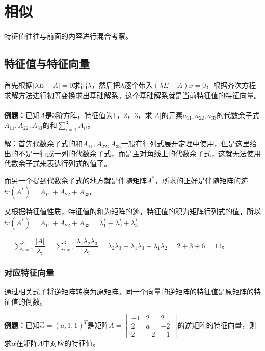 \newpage
\section{相似}

特征值往往与前面的内容进行混合考察。

\subsection{特征值与特征向量}

首先根据$\vert\lambda E-A\vert=0$求出$\lambda$，然后把$\lambda$逐个带入$(\lambda E-A)x=0$，根据齐次方程求解方法进行初等变换求出基础解系。这个基础解系就是当前特征值的特征向量。

\paragraph{}

\textbf{例题：}已知$A$是3阶方阵，特征值为1，2，3，求$\vert A\vert$的元素$a_{11},a_{22},a_{33}$的代数余子式$A_{11},A_{22},A_{33}$的和$\sum\limits_{i=1}^3A_{ii}$。

解：首先代数余子式的和$A_{11},A_{22},A_{33}$一般在行列式展开定理中使用，但是这里给出的不是一行或一列的代数余子式，而是主对角线上的代数余子式，这就无法使用代数余子式来表达行列式的值了。

而另一个提到代数余子式的地方就是伴随矩阵$A^*$，所求的正好是伴随矩阵的迹$tr(A^*)=A_{11}+A_{22}+A_{33}$。

又根据特征值性质，特征值的和为矩阵的迹，特征值的积为矩阵行列式的值，所以$tr(A^*)=A_{11}+A_{22}+A_{33}=\lambda_1^*+\lambda_2^*+\lambda_3^*$

$=\sum\limits_{i=1}^3\dfrac{\vert A\vert}{\lambda_i}=\sum\limits_{i=1}^3\dfrac{\lambda_1\lambda_2\lambda_3}{\lambda_i}=\lambda_2\lambda_3+\lambda_1\lambda_3+\lambda_1\lambda_2=2+3+6=11$。

\paragraph{}

\subsubsection{对应特征向量}

通过相关式子将逆矩阵转换为原矩阵。同一个向量的逆矩阵的特征值是原矩阵的特征值的倒数。

\textbf{例题：}已知$\overrightarrow{\alpha}=(a,1,1)^T$是矩阵$A=\left[\begin{array}{ccc}
    -1 & 2 & 2 \\
    2 & a & -2 \\
    2 & -2 & -1
\end{array}\right]$的逆矩阵的特征向量，则求$\overrightarrow{\alpha}$在矩阵$A$中对应的特征值。

